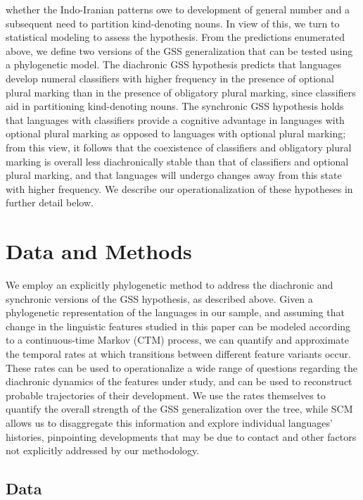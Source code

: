 \documentclass[11pt]{article}
\begin{document}
whether 
the Indo-Iranian patterns 
owe to 
development of general number and a subsequent need to partition kind-denoting nouns. 
In view of this, we turn to statistical modeling to assess the hypothesis. 
From the predictions enumerated above, we define two versions of the GSS generalization that can be tested using a phylogenetic model. The {\sc diachronic} GSS hypothesis predicts that languages develop numeral classifiers with higher frequency in the presence of optional plural marking than in the presence of obligatory plural marking, since classifiers aid in partitioning kind-denoting nouns. The {\sc synchronic} GSS hypothesis holds that languages with classifiers provide a cognitive advantage in languages with optional plural marking as opposed to languages with optional plural marking; from this view, it follows that the coexistence of classifiers and obligatory plural marking is overall less diachronically stable than that of classifiers and optional plural marking, and that languages will undergo changes away from this state with higher frequency. We describe our operationalization of these hypotheses in further detail below.


\section{Data and Methods} \label{methods}

We employ an explicitly phylogenetic method to address the diachronic and synchronic versions of the GSS hypothesis, as described above. Given a phylogenetic representation of the languages in our sample, and assuming that change in the linguistic features studied in this paper can be modeled according to a continuous-time Markov (CTM) process, we can quantify and approximate the temporal rates at which transitions between different feature variants occur. These rates can be used to operationalize a wide range of questions regarding the diachronic dynamics of the features under study, and can be used to reconstruct probable trajectories of their development. 
We use the rates themselves to quantify the overall strength of the GSS generalization over the tree, while SCM allows us to disaggregate this information and explore individual languages' histories, pinpointing developments that may be due to contact and other factors not explicitly addressed by our methodology.

\subsection{Data}
\end{document}
